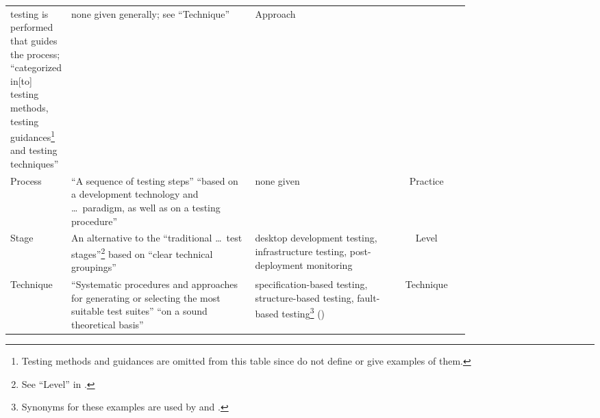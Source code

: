 \begin{paperTable}
\begin{minipage}{\linewidth}
\begin{tabular}{|>{\centering}m{0.08\linewidth}|m{0.4\linewidth}|m{0.3\linewidth}|c|}
            testing is performed that guides the process; ``categorized in[to] testing methods,
            testing guidances\footnote{Testing methods and guidances are omitted from this table
                since \citet{BarbosaEtAl2006} do not define or give examples of them.} and testing techniques''
            \citep[p.~3]{BarbosaEtAl2006}          & none given
            generally; see ``Technique''           & Approach                                                               \\
            Process                                & ``A sequence of
            testing steps'' \citep[p.~2]{BarbosaEtAl2006} ``based on a development technology and \dots\
            paradigm, as well as on a testing procedure''
            \citetext{p.~3}                        & none given                   & Practice                                \\
            Stage                                  & An
            alternative to the ``traditional \dots\ test stages''\footnote{See ``Level'' in
                \Cref{tab:ieeeTestTerms}.} based on ``clear technical groupings''
            \citep[p.~13]{Gerrard2000a}            & desktop development testing,
            infrastructure testing,
            post-deployment monitoring
            \citep[p.~13]{Gerrard2000a}            & Level                                                                  \\
            Technique                              & ``Systematic
            procedures and approaches for generating or selecting the most suitable test
            suites'' \citep[p.~5\=/10]{SWEBOK2024} ``on a sound theoretical basis''
            \citep[p.~3]{BarbosaEtAl2006}          & specification-based testing,
            structure-based testing, fault-based testing\footnote{Synonyms for
                these examples are used by \citet[p.~3; OG Mathur, 2012]{SouzaEtAl2017}
                and \citet[p.~3]{BarbosaEtAl2006}.}
            (\citealp[pp.~5\=/10, 5\=/13 to 5\=/15]{SWEBOK2024})
                                                   & Technique                                                              \\
            \hline
        \end{tabular}
    \end{minipage}
\end{paperTable}